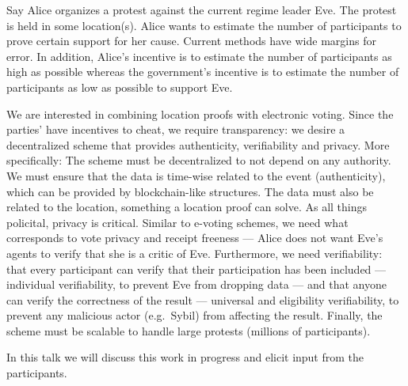 Say Alice organizes a protest against the current regime leader Eve.
The protest is held in some location(s).
Alice wants to estimate the number of participants to prove certain support for
her cause.
Current methods have wide margins for error.
In addition, Alice's incentive is to estimate the number of participants as 
high as possible whereas the government's incentive is to estimate the number 
of participants as low as possible to support Eve.

We are interested in combining location proofs with electronic voting.
Since the parties' have incentives to cheat, we require transparency: we desire 
a decentralized scheme that provides authenticity, verifiability and privacy.
More specifically:
The scheme must be decentralized to not depend on any authority.
We must ensure that the data is time-wise related to the event (authenticity), 
which can be provided by blockchain-like structures.
The data must also be related to the location, something a location proof can 
solve.
As all things policital, privacy is critical.
Similar to e-voting schemes, we need what corresponds to vote privacy and 
receipt freeness --- Alice does not want Eve's agents to verify that she is a 
critic of Eve.
Furthermore, we need verifiability: that every participant can verify that 
their participation has been included --- individual verifiability, to prevent 
Eve from dropping data --- and that anyone can verify the correctness of the 
result --- universal and eligibility verifiability, to prevent any malicious 
actor (e.g.\ Sybil) from affecting the result.
Finally, the scheme must be scalable to handle large protests (millions of 
participants).

In this talk we will discuss this work in progress and elicit input from the 
participants.

